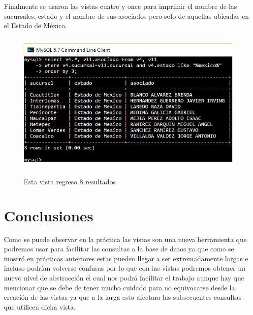 \documentclass[12pt, titlepage]{article}
\begin{document}
	Finalmente se usaron las vistas cuatro y once para imprimir el nombre de las sucursales, estado y el nombre de sus asociados pero solo de aquellas ubicadas en el Estado de México.
	\begin{figure}[H]
		\begin{center}
			\includegraphics[width=12cm, height=7cm]{img/v17.png}
			\label{fig:17}
			\caption{Esta vista regreso 8 resultados}
		\end{center}
	\end{figure}
	
	
	\section{Conclusiones}
	Como se puede observar en la práctica las vistas son una nueva herramienta que podremos usar para facilitar las consultas a la base de datos ya que como se mostró en prácticas anteriores estas pueden llegar a ser extremadamente largas e incluso podrían volverse confusas por lo que con las vistas podremos obtener un nuevo nivel de abstracción el cual nos podrá facilitar el trabajo aunque hay que mencionar que se debe de tener mucho cuidado para no equivocarse desde la creación de las vistas ya que a la larga esto afectara las subsecuentes consultas que utilicen dicha vista.
	 
	
\end{document}
